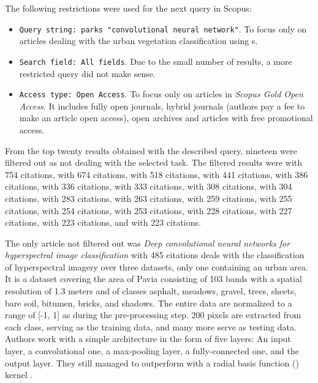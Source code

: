 The following restrictions were used for the next query in Scopus:

\begin{itemize}
	\item \verb|Query string: parks "convolutional neural network"|. To fo\-cus on\-ly on articles dealing with the urban vegetation classification using s.
	\item \verb|Search field: All fields|. Due to the small number of results, a more restricted query did not make sense.
	\item \verb|Access type: Open Access|. To focus only on articles in \textit{Scopus Gold Open Access}. It includes fully open journals, hybrid journals (authors pay a fee to make an article open access), open archives and articles with free promotional access.
\end{itemize}

\noindent From the top twenty results obtained with the described query, nineteen were filtered out as not dealing with the selected task. The filtered results were \cite{dl-dna-rna} with 754 citations, \cite{lstm-activity} with 674 citations, \cite{visual-genome} with 518 citations, \cite{dl-computational-biology} with 441 citations, \cite{text-detection-imagery} with 386 citations, \cite{opportunities-biology-medicine} with 336 citations, \cite{neuromorphic-computing} with 333 citations, \cite{cnn-traffic} with 308 citations, \cite{dnn-plant-diseases} with 304 citations, \cite{dl-for-cv} with 283 citations, \cite{face-classification} with 263 citations, \cite{human-transcription-factors} with 259 citations, \cite{ecg-heartbeat} with 255 citations, \cite{ml-medical-imaging} with 254 citations, \cite{visual-question-answering} with 253 citations, \cite{soli} with 228 citations, \cite{cnn-neuromorphic-computing} with 227 citations, \cite{dl-fault-diagnosis} with 223 citations, and \cite{basset} with 223 citations.

The only article not filtered out was \textit{Deep convolutional neural networks for hyperspectral image classification} \cite{cnn-hs} with 485 citations deals with the classification of hyperspectral imagery over three datasets, only one containing an urban area. It is a dataset covering the area of Pavia consisting of 103 bands with a spatial resolution of 1.3 meters and of classes asphalt, meadows, gravel, trees, sheets, bare soil, bitumen, bricks, and shadows. The entire data are normalized to a range of [-1, 1] as during the pre-processing step. 200 pixels are extracted from each class, serving as the training data, and many more serve as testing data. Authors work with a simple  architecture in the form of five layers: An input layer, a convolutional one, a max-pooling layer, a fully-connected one, and the output layer. They still managed to outperform  with a radial basis function () kernel \cite{rbf-kernel}.

